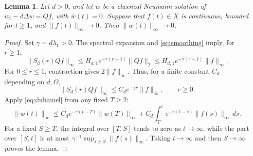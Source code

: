 \documentclass[11pt,a4paper]{article}
\newtheorem{lemma}[theorem]{Lemma}
\begin{document}
\begin{lemma}\label{lem:forced}
Let \(d>0\), and let \(w\) be a classical Neumann solution of
\(w_t-d\Delta w=Qf\), with \(\bar w(t)=0\). Suppose that \(f(t)\in X\)
is continuous, bounded for \(t\ge1\), and
\(\|f(t)\|_\infty\to0\). Then \(\|w(t)\|_\infty\to0\).
\end{lemma}
\begin{proof}
Set \(\gamma=d\lambda_1>0\). The spectral expansion and
\eqref{eq:smoothing} imply, for \(r\ge1\),
\[
 \|S_d(r)Qf\|_\infty
 \le H_{d,1}e^{-\gamma(r-1)}\|Qf\|_2
 \le H_{d,1}e^{-\gamma(r-1)}\|f\|_\infty.
\]
For \(0\le r\le1\), contraction gives \(2\|f\|_\infty\).
Thus, for a finite constant \(C_d\) depending on \(d,\Omega\),
\begin{equation}\label{eq:decay}
 \|S_d(r)Qf\|_\infty
 \le C_de^{-\gamma r}\|f\|_\infty,\qquad r\ge0 .
\end{equation}
Apply \eqref{eq:duhamel} from any fixed \(T\ge2\):
\[
 \|w(t)\|_\infty
 \le C_de^{-\gamma(t-T)}\|w(T)\|_\infty+
 C_d\int_T^t e^{-\gamma(t-s)}\|f(s)\|_\infty\,ds .
\]
For a fixed \(S\ge T\), the integral over \([T,S]\) tends to zero as
\(t\to\infty\), while the part over \([S,t]\) is at most
\(\gamma^{-1}\sup_{s\ge S}\|f(s)\|_\infty\).
Taking \(t\to\infty\) and then \(S\to\infty\) proves the lemma.
\end{proof}
\end{document}
